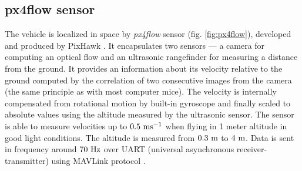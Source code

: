 \subsection{px4flow sensor}
\label{cap:px4flow}

The vehicle is localized in space by \textit{px4flow} sensor \citep{px4flow, honegger2013open} (fig. \ref{fig:px4flow}), developed and produced by PixHawk \citep{pixhawk}. It encapsulates two sensors --- a camera for computing an optical flow and an ultrasonic rangefinder for measuring a distance from the ground. It provides an information about its velocity relative to the ground computed by the correlation of two consecutive images from the camera (the same principle as with most computer mice). The velocity is internally compensated from rotational motion by built-in gyroscope and finally scaled to absolute values using the altitude measured by the ultrasonic sensor. The sensor is able to measure velocities up to $0.5~\mathrm{ms^{-1}}$ when flying in 1 meter altitude in good light conditions. The altitude is measured from $0.3~\mathrm{m}$ to $4~\mathrm{m}$. Data is sent in frequency around $70~\mathrm{Hz}$ over UART (universal asynchronous receiver-transmitter) using MAVLink protocol \citep{px4flow}.

